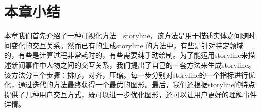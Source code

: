 \section{本章小结}
本章我们首先介绍了一种可视化方法－storyline，该方法是用于描述实体之间随时间变化的交互关系。然而已有的生成storyline 的方法中，有些是针对特定领域的，有些是计算过程非常耗时的，有些需要纯手动绘制。为了能运用storyline来描述新闻事件中人物之间的交互关系，我们提出了自己的一套方法来生成storyline。该方法分三个步骤：排序，对齐，压缩。每一步分别对storyline的一个指标进行优化，通过迭代的方法最终获得一个最优的图形。最后，我们还根据storyline的特点提供了几种用户交互方式，既可以进一步优化图形，还可以让用户更好的理解事件详情。

